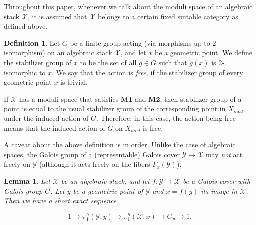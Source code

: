 \documentclass{amsart}
\newtheorem{lem}[thm]{Lemma}
\theoremstyle{definition}
\newtheorem{defn}[thm]{Definition}
\theoremstyle{remark}
\theoremstyle{remark}
\newcommand{\X}{\mathcal{X}}
\newcommand{\Y}{\mathcal{Y}}
\newcommand{\Xm}{X_{mod}}
\newcommand{\phX}{\pi_1^{h}(\X,x)}
\newcommand{\phY}{\pi_1^{h}(\Y,y)}
\let\:=\colon
\begin{document}
 Throughout this paper, whenever we
talk about the moduli space of an algebraic stack $\X$, it is
assumed that $\X$ belongs to a certain fixed suitable category as
defined above.

\begin{defn}{\label{D:free}}
Let $G$ be a finite group acting (via
morphisms-up-to-2-isomorphism) on  an algebraic stack $\X$, and
let $x$ be a geometric point. We define the {stabilizer group} of
$x$ to be the set of all $g \in G$ such that $g(x)$ is
2-isomorphic to $x$. We say that the action is {\it free}, if the
stabilizer group of every  geometric point $x$ is trivial.
\end{defn}

If $\X$ has a moduli space that satisfies $\mathbf{M1}$ and
$\mathbf{M2}$, then stabilizer group of a point is equal to the
usual stabilizer group of the corresponding point in $\Xm$ under
the induced action of $G$. Therefore, in this case, the action
being free means that the induced action of $G$ on $\Xm$ is free.

A caveat about the above definition is in order. Unlike the case
of algebraic spaces, the Galois group of a (representable) Galois
cover $\Y \to \X$ may {\em not} act freely on $\Y$ (although it
acts freely on the fibers $F_x(\Y)$).

\begin{lem}{\label{L:free}}
Let $\X$ be an algebraic stack, and let $f \: \Y \to \X$ be a
Galois cover with Galois group $G$. Let $y$ be a geometric point
of $\Y$ and $x=f(y)$ its image in $\X$. Then we have a short exact
sequence

$$1 \to \phY \to \phX \to G_y \to 1.$$
\end{lem}
\end{document}
